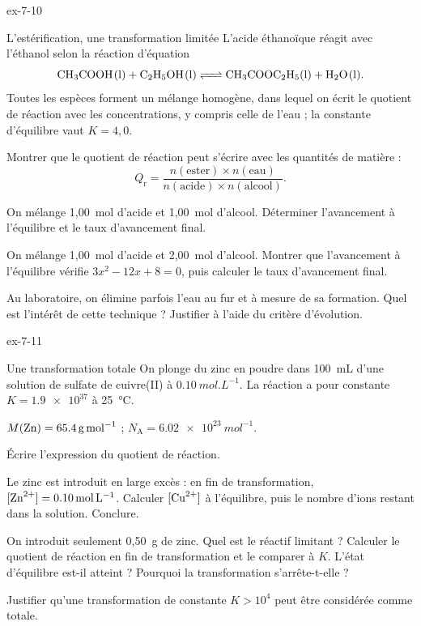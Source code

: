 \begin{blocLivre}{ex-7-10}
\begin{exercice}[2]{L'estérification, une transformation limitée}
L'acide éthanoïque réagit avec l'éthanol selon la réaction d'équation
\[\ce{CH3COOH(l) + C2H5OH(l) <=> CH3COOC2H5(l) + H2O(l)}.\]
Toutes les espèces forment un mélange homogène, dans lequel on écrit le quotient de réaction avec les concentrations,
y compris celle de l'eau ; la constante d'équilibre vaut $K=4{,}0$.
\begin{questions}
\item Montrer que le quotient de réaction peut s'écrire avec les quantités de matière :
\[Q_\mathrm{r}=\frac{n(\text{ester})\times n(\text{eau})}{n(\text{acide})\times n(\text{alcool})}.\]
\item On mélange 1,00~mol d'acide et 1,00~mol d'alcool. Déterminer l'avancement à l'équilibre et le taux
d'avancement final.
\item On mélange 1,00~mol d'acide et 2,00~mol d'alcool. Montrer que l'avancement à l'équilibre vérifie
$3x^2-12x+8=0$, puis calculer le taux d'avancement final.
\item Au laboratoire, on élimine parfois l'eau au fur et à mesure de sa formation. Quel est l'intérêt de cette
technique ? Justifier à l'aide du critère d'évolution.
\end{questions}
\end{exercice}
\end{blocLivre}
\begin{blocLivre}{ex-7-11}
\begin{exercice}[2]{Une transformation totale}
On plonge du zinc en poudre dans 100~mL d'une solution de sulfate de cuivre(II) à $\qty{0,10}{mol.L^{-1}}$. La réaction
 a pour constante $K=\num{1.9e37}$ à 25~°C.
\begin{donnees}
$M(\ce{Zn})=\qty{65,4}{g.mol^{-1}}$ ; $N_\mathrm{A}=\qty{6,02e23}{mol^{-1}}$.
\end{donnees}
\begin{questions}
\item Écrire l'expression du quotient de réaction.
\item Le zinc est introduit en large excès : en fin de transformation, $[\ce{Zn^2+}]=\qty{0,10}{mol.L^{-1}}$. Calculer
$[\ce{Cu^2+}]$ à l'équilibre, puis le nombre d'ions  restant dans la solution. Conclure.
\item On introduit seulement 0,50~g de zinc. Quel est le réactif limitant ? Calculer le quotient de réaction en fin de
transformation et le comparer à $K$. L'état d'équilibre est-il atteint ? Pourquoi la transformation s'arrête-t-elle ?
\item Justifier qu'une transformation de constante $K>10^4$ peut être considérée comme totale.
\end{questions}
\end{exercice}
\end{blocLivre}
